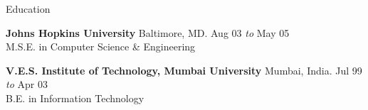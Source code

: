 \documentclass{resume} %
\begin{document}

\begin{rSection}{Education}

{\bf Johns Hopkins University} \hfill Baltimore, MD. Aug 03 {\em to} May 05 \\ 
M.S.E. in Computer Science \& Engineering


{\bf V.E.S. Institute of Technology, Mumbai University} \hfill Mumbai, India. Jul 99 {\em to} Apr 03 \\ 
B.E. in Information Technology

\end{rSection}





\end{document}
